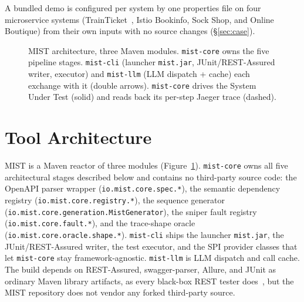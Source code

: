 \documentclass[sigconf,screen,review]{acmart}
\begin{document}
\noindent A bundled demo is configured per system by one properties file on four microservice systems (TrainTicket~\cite{Zhou2018BenchTraintAnalysisSurvey}, Istio Bookinfo, Sock Shop, and Online Boutique) from their own inputs with no source changes (\S\ref{sec:case}).


\begin{figure}[!ht]
  \centering
  \resizebox{\textwidth}{!}{}
  \caption{MIST architecture, three Maven modules. \texttt{mist-core} owns the five pipeline stages. \texttt{mist-cli} (launcher \texttt{mist.jar}, JUnit/REST-Assured writer, executor) and \texttt{mist-llm} (LLM dispatch + cache) each exchange with it (double arrows). \texttt{mist-core} drives the System Under Test (solid) and reads back its per-step Jaeger trace (dashed).}
  \label{fig:arch}
\end{figure}

\section{Tool Architecture}\label{sec:arch}

MIST is a Maven reactor of three modules (Figure~\ref{fig:arch}). \texttt{mist-core} owns all five architectural stages described below and contains no third-party source code: the OpenAPI parser wrapper (\texttt{io.mist.core.spec.*}), the semantic dependency registry (\texttt{io.mist.core.registry.*}), the sequence generator (\texttt{io.mist.core.generation.MistGenerator}), the sniper fault registry (\texttt{io.mist.core.fault.*}), and the trace-shape oracle (\texttt{io.mist.core.oracle.shape.*}). \texttt{mist-cli} ships the launcher \texttt{mist.jar}, the JUnit/REST-Assured writer, the test executor, and the SPI provider classes that let \texttt{mist-core} stay framework-agnostic. \texttt{mist-llm} is LLM dispatch and call cache. The build depends on REST-Assured, swagger-parser, Allure, and JUnit as ordinary Maven library artifacts, as every black-box REST tester does~\cite{MartinLopez2021RESTest,Arcuri2019EvoMasterTOSEM,Atlidakis2019RESTler}, but the MIST repository does not vendor any forked third-party source.
\end{document}
